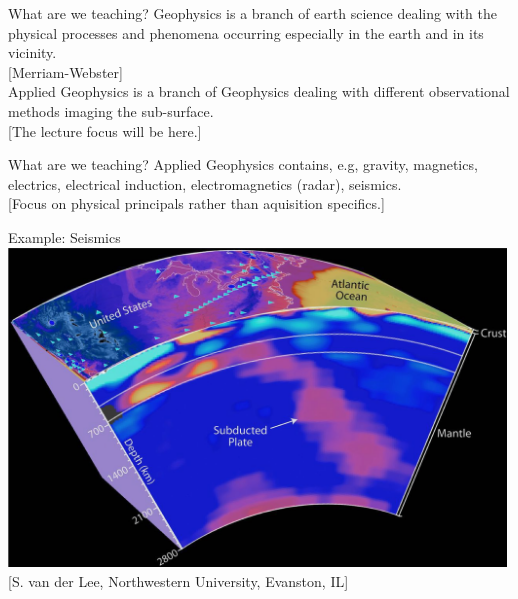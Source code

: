 \begin{frame}
    \begin{PointSix}{What are we teaching?}
        \small
        \alert{Geophysics} is a branch of earth science dealing with the physical processes and phenomena occurring especially in the earth and in its vicinity.\\
        \vspace{0.25cm}
        \tiny [Merriam-Webster]\\
        \small
        \vspace{2.25cm}
        \alert{Applied Geophysics} is a branch of Geophysics dealing with different observational methods imaging the sub-surface.\\
        \vspace{0.25cm}
        \tiny [The lecture focus will be here.]
    \end{PointSix}
\end{frame}

\begin{frame}
    \begin{PointSix}{What are we teaching?}
        \small
        \alert{Applied Geophysics} contains, e.g, gravity, magnetics, electrics, electrical induction, electromagnetics (radar), seismics.\\
        \vspace{0.25cm}
        \tiny [Focus on physical principals rather than aquisition specifics.]
    \end{PointSix}
\end{frame}

\begin{frame}
    \begin{PointSix}{Example: Seismics}
        \includegraphics[width=0.99\textwidth]{Figures/General/GeophysExamples/Seismics_SvdLEE_Evanston_IL.png}
        \tiny[S. van der Lee, Northwestern University, Evanston, IL]

    \end{PointSix}
\end{frame}

